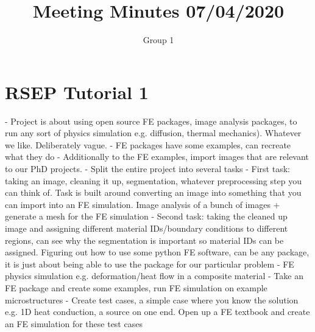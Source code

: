 \documentclass{article}
\title{\bf Meeting Minutes 07/04/2020}
\author{Group 1}
\begin{document}
\maketitle


\section{RSEP Tutorial 1}


- Project is about using open source FE packages, image analysis packages, to run any sort of physics simulation e.g. diffusion, thermal mechanics). Whatever we like. Deliberately vague. \newline\newline 
- FE packages have some examples, can recreate what they do\newline\newline
- Additionally to the FE examples, import images that are relevant to our PhD projects.\newline\newline
- Split the entire project into several tasks\newline\newline
- First task: taking an image, cleaning it up, segmentation, whatever preprocessing step you can think of. Task is built around converting an image into something that you can import into an FE simulation. Image analysis of a bunch of images + generate a mesh for the FE simulation\newline\newline
- Second task: taking the cleaned up image and assigning different material IDs/boundary conditions to different regions, can see why the segmentation is important so material IDs can be assigned. Figuring out how to use some python FE software, can be any package, it is just about being able to use the package for our particular problem\newline\newline
- FE physics simulation e.g. deformation/heat flow in a composite material\newline\newline
- Take an FE package and create some examples, run FE simulation on example microstructures\newline\newline
- Create test cases, a simple case where you know the solution e.g. 1D heat conduction, a source on one end. Open up a FE textbook and create an FE simulation for these test cases\newline\newline
\end{document}
